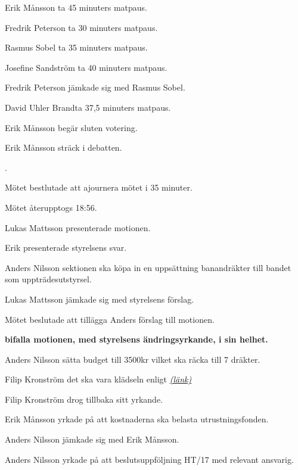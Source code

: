 \documentclass[10pt]{article}
\def\ji{David Uhler Brand}
\begin{document}
\begin{paragrafer}
\begin{paragrafer}
        Erik Månsson \ypa ta 45 minuters matpaus.

        Fredrik Peterson \ypa ta 30 minuters matpaus.

        Rasmus Sobel \ypa ta 35 minuters matpaus.

        Josefine Sandström \ypa ta 40 minuters matpaus.

        Fredrik Peterson jämkade sig med Rasmus Sobel.

        \ji  \ypa ta 37,5 minuters matpaus.

        Erik Månsson begär sluten votering.

        Erik Månsson \ypa sträck i debatten.

        \Mbaby.

        Mötet bestlutade att ajournera mötet i 35 minuter.

        Mötet återupptogs 18:56.
    \end{paragrafer}

        \begin{paragrafer}
          Lukas Mattsson presenterade motionen.

          Erik presenterade styrelsens svar.

          Anders Nilsson \ypa sektionen ska köpa in en uppsättning banandräkter till bandet som uppträdesutstyrsel.

          Lukas Mattsson jämkade sig med styrelsens förslag.

          Mötet beslutade att tillägga Anders förslag till motionen.

          \textbf{\Mba bifalla motionen, med styrelsens ändringsyrkande, i sin helhet.}

          Anders Nilsson \ypa sätta budget till 3500kr vilket ska räcka till 7 dräkter.

          Filip Kronström \ypa det ska vara klädseln enligt
          \href{http://www.ebay.com/itm/Willy-Adult-Unisex-Banana-Suits-Yellow-Costume-Light-Fruit-Party-Fancy-Dress-/152488835359?hash=item23810af91f:g:rA0AAOSwB-1Y2mCV}{\textit{(länk)}}

          Filip Kronström drog tillbaka sitt yrkande.

          Erik Månsson yrkade på att kostnaderna ska belasta utrustningsfonden.

          Anders Nilsson jämkade sig med Erik Månsson.

          Anders Nilsson yrkade på att beslutsuppföljning HT/17 med relevant ansvarig.


\end{paragrafer}
\end{paragrafer}
\end{document}
